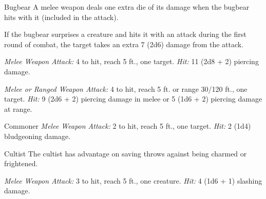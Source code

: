 \documentclass[10pt,a4paper,twoside,bg=print,twocolumn,openany,nodeprecatedcode]{dndbook}
\begin{document}
\begin{DndMonster}[float=t]{Bugbear}
\DndMonsterBasics[
armor-class = {16 (\textit{hide armor})},
hit-points = {\DndDice{5d8 + 5}},
speed = {30 ft.}
]
\DndMonsterAbilityScores[
 str = 15,
 dex = 14,
 con = 13,
 int = 8,
 wis = 11,
 cha = 9
]
\DndMonsterDetails[
skills = {Stealth +6, Survival +2},
senses = {darkvision 60 ft., passive perception 10},
languages = {Common, Goblin},
challenge = 1,
]
A melee weapon deals one extra die of its damage when the bugbear hits with it (included in the attack).

If the bugbear surprises a creature and hits it with an attack during the first round of combat, the target takes an extra 7 (2d6) damage from the attack.

\textsl{Melee Weapon Attack:} 4 to hit, reach 5 ft., one target. \textsl{Hit:} 11 (2d8 + 2) piercing damage.

\textsl{Melee or Ranged Weapon Attack:} 4 to hit, reach 5 ft. or range 30/120 ft., one target. \textsl{Hit:} 9 (2d6 + 2) piercing damage in melee or 5 (1d6 + 2) piercing damage at range.

\end{DndMonster}



\begin{DndMonster}[float=t]{Commoner}
\DndMonsterBasics[
armor-class = {10},
hit-points = {\DndDice{1d8}},
speed = {30 ft.}
]
\DndMonsterAbilityScores[
 str = 10,
 dex = 10,
 con = 10,
 int = 10,
 wis = 10,
 cha = 10
]
\DndMonsterDetails[
languages = {any one language (usually Common)},
challenge = 0,
]
\textsl{Melee Weapon Attack:} 2 to hit, reach 5 ft., one target. \textsl{Hit:} 2 (1d4) bludgeoning damage.

\end{DndMonster}



\begin{DndMonster}[float=t]{Cultist}
\DndMonsterBasics[
armor-class = {12 (\textit{leather armor})},
hit-points = {\DndDice{2d8}},
speed = {30 ft.}
]
\DndMonsterAbilityScores[
 str = 11,
 dex = 12,
 con = 10,
 int = 10,
 wis = 11,
 cha = 10
]
\DndMonsterDetails[
skills = {Deception +2, Religion +2},
languages = {any one language (usually Common)},
challenge = 1/8,
]
The cultist has advantage on saving throws against being charmed or frightened.

\textsl{Melee Weapon Attack:} 3 to hit, reach 5 ft., one creature. \textsl{Hit:} 4 (1d6 + 1) slashing damage.

\end{DndMonster}
\end{document}
